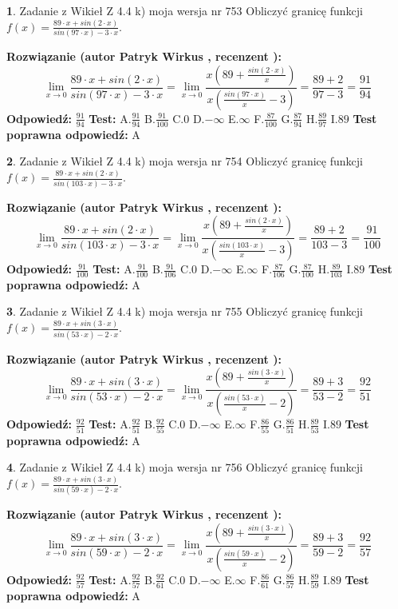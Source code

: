 \documentclass[12pt, a4paper]{article}
\theoremstyle{definition} %
\newtheorem{zad}{}
\newcommand{\zadStart}[1]{\begin{zad}#1\newline}
\newcommand{\zadStop}{\end{zad}}
\newcommand{\rozwStart}[2]{\noindent \textbf{Rozwiązanie (autor #1 , recenzent #2): }\newline}
\newcommand{\rozwStop}{\newline}
\newcommand{\odpStart}{\noindent \textbf{Odpowiedź:}\newline}
\newcommand{\odpStop}{\newline}
\newcommand{\testStart}{\noindent \textbf{Test:}\newline}
\newcommand{\testStop}{\newline}
\newcommand{\kluczStart}{\noindent \textbf{Test poprawna odpowiedź:}\newline}
\newcommand{\kluczStop}{\newline}
\begin{document}
\zadStart{Zadanie z Wikieł Z 4.4 k) moja wersja nr 753}
Obliczyć granicę funkcji $f(x)=\frac{89\cdot x +sin(2\cdot x)}{sin(97\cdot x) -3\cdot x}$.
\zadStop
\rozwStart{Patryk Wirkus}{}
$$\lim\limits_{x\to 0}\frac{89\cdot x +sin(2\cdot x)}{sin(97\cdot x) -3\cdot x}
=\lim\limits_{x\to 0}\frac{x(89+\frac{sin(2\cdot x)}{x})}{x(\frac{sin(97\cdot x)}{x}-3)}
=\frac{89+2}{97-3} = \frac{91}{94}$$
\rozwStop
\odpStart
$\frac{91}{94}$
\odpStop
\testStart
A.$\frac{91}{94}$
B.$\frac{91}{100}$
C.$0$
D.$-\infty$
E.$\infty$
F.$\frac{87}{100}$
G.$\frac{87}{94}$
H.$\frac{89}{97}$
I.$89$
\testStop
\kluczStart
A
\kluczStop



\zadStart{Zadanie z Wikieł Z 4.4 k) moja wersja nr 754}
Obliczyć granicę funkcji $f(x)=\frac{89\cdot x +sin(2\cdot x)}{sin(103\cdot x) -3\cdot x}$.
\zadStop
\rozwStart{Patryk Wirkus}{}
$$\lim\limits_{x\to 0}\frac{89\cdot x +sin(2\cdot x)}{sin(103\cdot x) -3\cdot x}
=\lim\limits_{x\to 0}\frac{x(89+\frac{sin(2\cdot x)}{x})}{x(\frac{sin(103\cdot x)}{x}-3)}
=\frac{89+2}{103-3} = \frac{91}{100}$$
\rozwStop
\odpStart
$\frac{91}{100}$
\odpStop
\testStart
A.$\frac{91}{100}$
B.$\frac{91}{106}$
C.$0$
D.$-\infty$
E.$\infty$
F.$\frac{87}{106}$
G.$\frac{87}{100}$
H.$\frac{89}{103}$
I.$89$
\testStop
\kluczStart
A
\kluczStop



\zadStart{Zadanie z Wikieł Z 4.4 k) moja wersja nr 755}
Obliczyć granicę funkcji $f(x)=\frac{89\cdot x +sin(3\cdot x)}{sin(53\cdot x) -2\cdot x}$.
\zadStop
\rozwStart{Patryk Wirkus}{}
$$\lim\limits_{x\to 0}\frac{89\cdot x +sin(3\cdot x)}{sin(53\cdot x) -2\cdot x}
=\lim\limits_{x\to 0}\frac{x(89+\frac{sin(3\cdot x)}{x})}{x(\frac{sin(53\cdot x)}{x}-2)}
=\frac{89+3}{53-2} = \frac{92}{51}$$
\rozwStop
\odpStart
$\frac{92}{51}$
\odpStop
\testStart
A.$\frac{92}{51}$
B.$\frac{92}{55}$
C.$0$
D.$-\infty$
E.$\infty$
F.$\frac{86}{55}$
G.$\frac{86}{51}$
H.$\frac{89}{53}$
I.$89$
\testStop
\kluczStart
A
\kluczStop



\zadStart{Zadanie z Wikieł Z 4.4 k) moja wersja nr 756}
Obliczyć granicę funkcji $f(x)=\frac{89\cdot x +sin(3\cdot x)}{sin(59\cdot x) -2\cdot x}$.
\zadStop
\rozwStart{Patryk Wirkus}{}
$$\lim\limits_{x\to 0}\frac{89\cdot x +sin(3\cdot x)}{sin(59\cdot x) -2\cdot x}
=\lim\limits_{x\to 0}\frac{x(89+\frac{sin(3\cdot x)}{x})}{x(\frac{sin(59\cdot x)}{x}-2)}
=\frac{89+3}{59-2} = \frac{92}{57}$$
\rozwStop
\odpStart
$\frac{92}{57}$
\odpStop
\testStart
A.$\frac{92}{57}$
B.$\frac{92}{61}$
C.$0$
D.$-\infty$
E.$\infty$
F.$\frac{86}{61}$
G.$\frac{86}{57}$
H.$\frac{89}{59}$
I.$89$
\testStop
\kluczStart
A
\kluczStop
\end{document}
